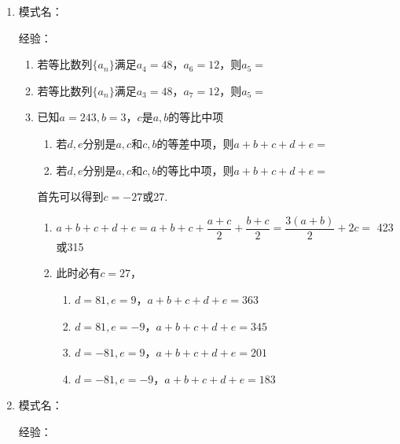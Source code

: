 \begin{enumerate}
    \item 模式名：
    
    经验：

    \begin{enumerate}
        \item 若等比数列$\{a_n\}$满足$a_4 = 48$，$a_6 = 12$，则$a_5 = $
        \item 若等比数列$\{a_n\}$满足$a_3 = 48$，$a_7 = 12$，则$a_5 = $
            
        \item 已知$a = 243, b = 3$，$c$是$a, b$的等比中项
        \begin{enumerate}
            \item 若$d, e$分别是$a, c$和$c, b$的等差中项，则$a+b+c+d+e = $
            \item 若$d, e$分别是$a, c$和$c, b$的等比中项，则$a+b+c+d+e = $
        \end{enumerate}
        \begin{jieda}
            首先可以得到$c = -27$或27.
            \begin{enumerate}
                \item $a+b+c+d+e = a+b+c + \dfrac{a+c}{2} + \dfrac{b+c}{2} = \dfrac{3(a+b)}{2} + 2c = $ 423或315
                \item 此时必有$c = 27$，\begin{enumerate}[1.]
                    \item $d = 81, e = 9$，$a+b+c+d+e = 363$
                    \item $d = 81, e = -9$，$a+b+c+d+e = 345$
                    \item $d = -81, e = 9$，$a+b+c+d+e = 201$
                    \item $d = -81, e = -9$，$a+b+c+d+e = 183$
                \end{enumerate}
            \end{enumerate}
        \end{jieda}
    \end{enumerate}

    \item 模式名：
    
    经验：


\end{enumerate}

